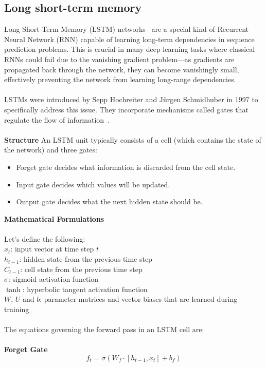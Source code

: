 \documentclass[12pt]{article}
\begin{document}
    \subsection{Long short-term memory}
    Long Short-Term Memory (LSTM) networks~\cite{hochreiter1997} are a special kind of Recurrent Neural
    Network (RNN) capable of learning long-term dependencies in sequence prediction
    problems. This is crucial in many deep learning tasks where classical RNNs could fail
    due to the vanishing gradient problem—as gradients are propagated back through the
    network, they can become vanishingly small, effectively preventing the network from
    learning long-range dependencies.\\
    \\
    LSTMs were introduced by Sepp Hochreiter and Jürgen Schmidhuber in 1997
    to specifically address this issue. They incorporate mechanisms called
    gates that regulate the flow of information~\cite{hochreiter1997}.\\
    \\
    \textbf{Structure}
    An LSTM unit typically consists of a cell (which contains the state of
    the network) and three gates:
    \begin{itemize}
    \item Forget gate decides what information is discarded from the cell state.
    \item Input gate decides which values will be updated.
    \item Output gate decides what the next hidden state should be.
    \end{itemize}
    \newpage
    \noindent \textbf{Mathematical Formulations}\\
    \\
    Let's define the following:\\
    \( x_t \): input vector at time step \( t \)\\
    \( h_{t-1} \): hidden state from the previous time step\\
    \( C_{t-1} \): cell state from the previous time step\\
    \( \sigma \): sigmoid activation function\\
    \( \tanh \): hyperbolic tangent activation function\\
    \( W \), \( U \) and \( b \): parameter matrices and vector biases that are learned during training\\
    \\
    The equations governing the forward pass in an LSTM cell are:\\
    \\
    \textbf{Forget Gate}
    \begin{equation}
        f_t = \sigma(W_f \cdot [h_{t-1}, x_t] + b_f)
    \end{equation}
\end{document}

